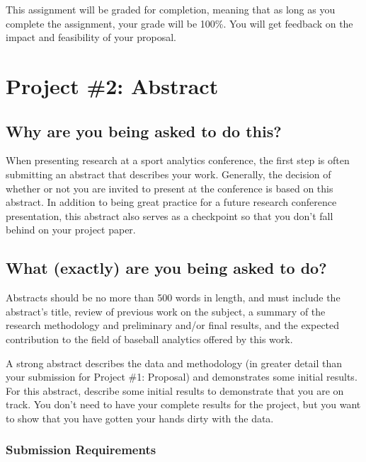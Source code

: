 \documentclass{article}
\begin{document}
      This assignment will be graded for completion, meaning that as long as you complete the assignment, your grade will be 100\%. You will get feedback on the impact and feasibility of your proposal.\\

  \newpage
  \section*{\sc Project \#2: Abstract}

    \subsection*{\sc Why are you being asked to do this?}

      When presenting research at a sport analytics conference, the first step is often submitting an abstract that describes your work. Generally, the decision of whether or not you are invited to present at the conference is based on this abstract. In addition to being great practice for a future research conference presentation, this abstract also serves as a checkpoint so that you don't fall behind on your project paper.

    \subsection*{\sc What (exactly) are you being asked to do?}

      Abstracts should be no more than 500 words in length, and must include the abstract’s title, review of previous work on the subject, a summary of the research methodology and preliminary and/or final results, and the expected contribution to the field of baseball analytics offered by this work.

      A strong abstract describes the data and methodology (in greater detail than your submission for Project \#1: Proposal) and demonstrates some initial results. For this abstract, describe some initial results to demonstrate that you are on track. You don't need to have your complete results for the project, but you want to show that you have gotten your hands dirty with the data.

      \subsubsection*{\sc Submission Requirements}
\end{document}
